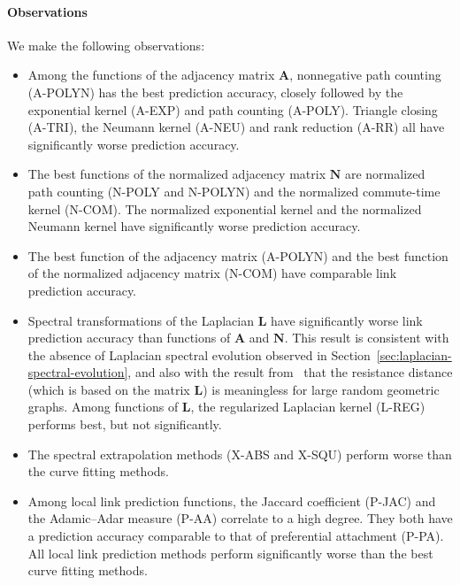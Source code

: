 \documentclass[11pt,a4paper]{book}
\begin{document}
\paragraph{Observations}
We make the following observations:
\begin{itemize}
\item Among the functions of the adjacency matrix $\mathbf A$,
  nonnegative path counting 
  (\textrm{A-POLYN}) has the best prediction accuracy, closely followed
  by the exponential kernel (\textrm{A-EXP}) and path counting
  (\textrm{A-POLY}).  Triangle closing (\textrm{A-TRI}), the Neumann
  kernel (\textrm{A-NEU}) and rank reduction (\textrm{A-RR}) all have
  significantly worse prediction accuracy.  
\item The best functions of the normalized adjacency matrix $\mathbf N$
  are normalized path counting (\textrm{N-POLY} and \textrm{N-POLYN}) and the
  normalized commute-time kernel (\textrm{N-COM}).  The normalized
  exponential kernel and the normalized Neumann kernel have
  significantly worse prediction accuracy. 
\item The best function of the adjacency matrix (\textrm{A-POLYN}) and the best
  function of the normalized adjacency matrix (\textrm{N-COM}) have
  comparable link prediction accuracy.  
\item Spectral transformations of the Laplacian $\mathbf L$ have
  significantly worse link prediction accuracy than functions of
  $\mathbf A$ and $\mathbf N$.  This result is consistent with the
  absence of Laplacian spectral evolution observed in
  Section~\ref{sec:laplacian-spectral-evolution}, and also with the
  result from~\cite{b526} that the resistance distance (which is based
  on the matrix $\mathbf L$) is meaningless for large random geometric
  graphs.  Among functions of $\mathbf L$, the regularized Laplacian
  kernel (\textrm{L-REG}) performs best, but not significantly. 
\item The spectral extrapolation methods (\textrm{X-ABS} and
  \textrm{X-SQU}) perform worse than the curve fitting methods.  
\item Among local link prediction functions, the Jaccard coefficient
  (\textrm{P-JAC}) and the Adamic--Adar measure (\textrm{P-AA})
  correlate to a high degree.  They both have a prediction
  accuracy comparable to that of preferential attachment
  (\textrm{P-PA}). 
  All local link prediction methods perform significantly worse than the
  best curve fitting methods. 
\end{itemize}
\end{document}
